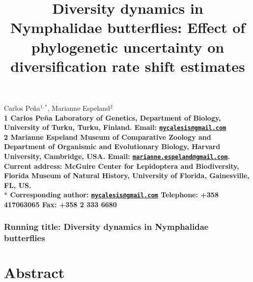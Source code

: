 \documentclass[10pt]{article}
\date{}
\begin{document}
\begin{flushleft}
{\Large
    \title{Diversity dynamics in Nymphalidae butterflies: Effect of phylogenetic uncertainty on diversification rate shift estimates}
}
\maketitle
Carlos Pe\~na$^{1,\ast}$,
Marianne Espeland$^{2}$
\\
\bf{1} Carlos Pe\~na Laboratory of Genetics, Department of Biology, University of Turku, Turku, Finland. Email: \href{mailto:mycalesis@gmail.com}{\nolinkurl{mycalesis@gmail.com}}
\\
\bf{2} Marianne Espeland Museum of Comparative Zoology and Department
of Organismic and Evolutionary Biology, Harvard University, Cambridge,
USA. Email:
\href{mailto:marianne.espeland@gmail.com}{\nolinkurl{marianne.espeland@gmail.com}}.
Current address: McGuire Center for Lepidoptera and Biodiversity,
Florida Museum of Natural History, University of Florida, Gainesville,
FL, US.
\\
$\ast$ \textbf{Corresponding author:}
\href{mailto:mycalesis@gmail.com}{\nolinkurl{mycalesis@gmail.com}}
Telephone: +358 417063065 Fax: +358 2 333 6680

\end{flushleft}




\subsubsection*{Running title: Diversity dynamics in Nymphalidae
butterflies}


\section*{Abstract}
\end{document}
